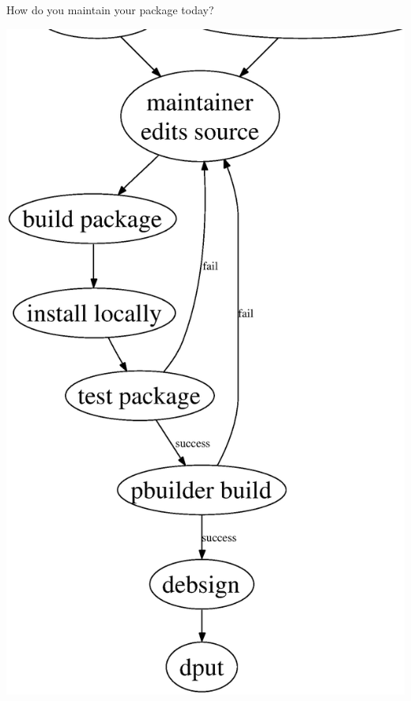 \documentclass[dvipdfm,12pt,times]{beamer}
\begin{document}
\begin{frame}{}
  \begin{minipage}{0.4\hsize}
   How do you maintain your package today?
  \end{minipage}
 \begin{minipage}{0.5\hsize}
  \includegraphics[height=0.95\vsize]{develcycle.eps}
 \end{minipage}
\end{frame}
 
\end{document}
